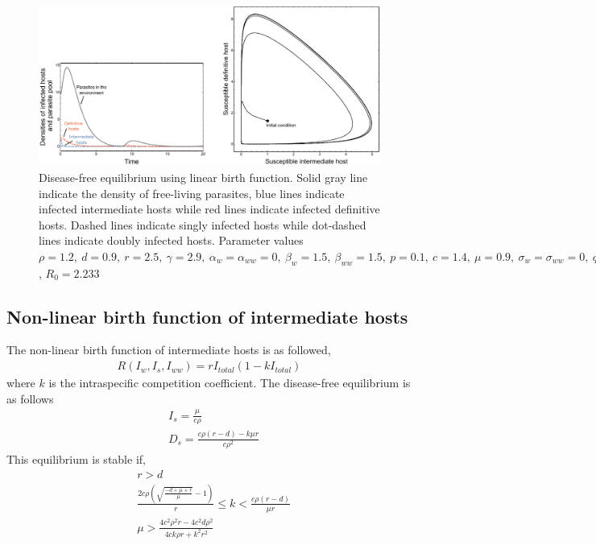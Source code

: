 \documentclass[11pt]{article}
\begin{document}
\begin{figure}
\includegraphics[width=\textwidth]{Figures/diseasefree_linear.pdf}
\caption{Disease-free equilibrium using linear birth function. Solid gray line indicate the density of free-living parasites, blue lines indicate infected intermediate hosts while red lines indicate infected definitive hosts. Dashed lines indicate singly infected hosts while dot-dashed lines indicate doubly infected hosts. Parameter values  $\rho = 1.2, \  d = 0.9, \  r = 2.5, \ \gamma = 2.9, \ \alpha_w =  \alpha_{ww} =  0, \ \beta_w  = 1.5, \ \beta_{ww} = 1.5, \ p = 0.1,  \ c = 1.4, \ \mu = 0.9,  \ \sigma_w = \sigma_{ww} = 0, \ q = 0.01, \  f_w = 6.5, \  f_{ww} = 7.5, \ \delta = 0.9$, $R_0 = 2.233$ } 
\label{fig:diseasefree:linear}
\end{figure}

\subsection*{Non-linear birth function of intermediate hosts}
The non-linear birth function of intermediate hosts is as followed,
\begin{align*}
R(I_w, I_s,I_{ww}) = r I_{total} (1 - k I_{total})
\end{align*}
%
where $k$ is the intraspecific competition coefficient. 
The disease-free equilibrium is as follows
%
\begin{align*}
& I_s = \frac{\mu}{c \rho } \\
& D_s = \frac{c \rho  (r-d) - k \mu  r}{c \rho ^2}
\end{align*}
%
This equilibrium is stable if,
%
\begin{align*}
& r > d \\
& \frac{2 c \rho  \left(\sqrt{\frac{-d+\mu +r}{\mu }}-1\right)}{r}\leq k < \frac{c \rho  (r-d)}{\mu  r} \\
& \mu >\frac{4 c^2 \rho ^2 r - 4 c^2 d \rho ^2}{4 c k \rho r + k^2 r^2}
\end{align*}
\end{document}
